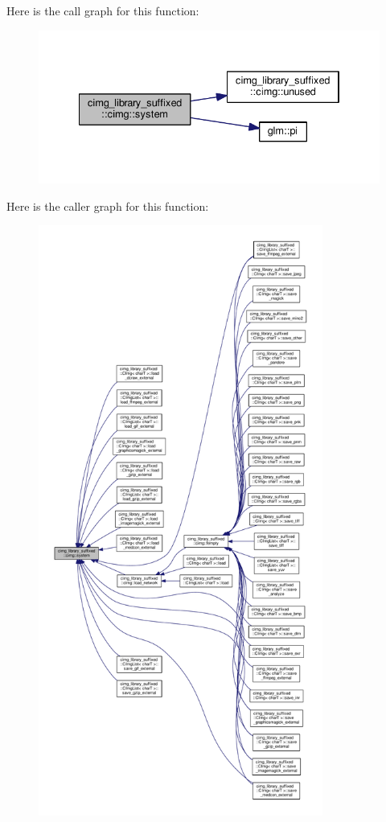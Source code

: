 Here is the call graph for this function\+:
\nopagebreak
\begin{figure}[H]
\begin{center}
\leavevmode
\includegraphics[width=334pt]{d4/d9b/namespacecimg__library__suffixed_1_1cimg_a5ddfa532b09b12973f543977f1f688da_cgraph}
\end{center}
\end{figure}
Here is the caller graph for this function\+:
\nopagebreak
\begin{figure}[H]
\begin{center}
\leavevmode
\includegraphics[height=550pt]{d4/d9b/namespacecimg__library__suffixed_1_1cimg_a5ddfa532b09b12973f543977f1f688da_icgraph}
\end{center}
\end{figure}
